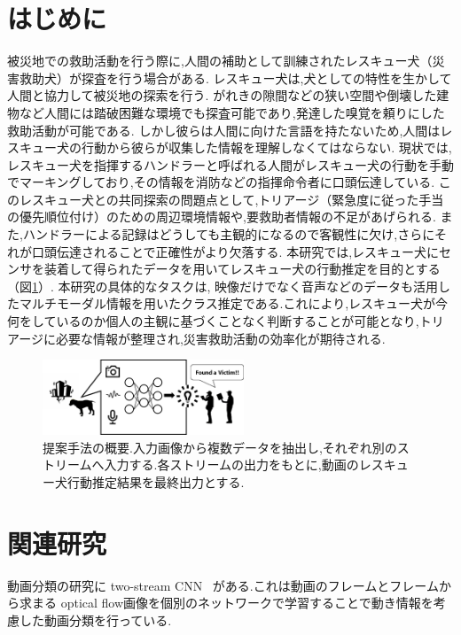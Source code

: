 \documentclass[MIRU,submit]{miru2019j}
\begin{document}
\section{はじめに}
被災地での救助活動を行う際に,人間の補助として訓練されたレスキュー犬（災害救助犬）が探査を行う場合がある.
レスキュー犬は,犬としての特性を生かして人間と協力して被災地の探索を行う.
がれきの隙間などの狭い空間や倒壊した建物など人間には踏破困難な環境でも探査可能であり,発達した嗅覚を頼りにした救助活動が可能である.
しかし彼らは人間に向けた言語を持たないため,人間はレスキュー犬の行動から彼らが収集した情報を理解しなくてはならない.
現状では,レスキュー犬を指揮するハンドラーと呼ばれる人間がレスキュー犬の行動を手動でマーキングしており,その情報を消防などの指揮命令者に口頭伝達している.
このレスキュー犬との共同探索の問題点として,トリアージ（緊急度に従った手当の優先順位付け）のための周辺環境情報や,要救助者情報の不足があげられる.
また,ハンドラーによる記録はどうしても主観的になるので客観性に欠け,さらにそれが口頭伝達されることで正確性がより欠落する.
本研究では,レスキュー犬にセンサを装着して得られたデータを用いてレスキュー犬の行動推定を目的とする（図\ref{lite_model}）.
本研究の具体的なタスクは, 映像だけでなく音声などのデータも活用したマルチモーダル情報を用いたクラス推定である.これにより,レスキュー犬が今何をしているのか個人の主観に基づくことなく判断することが可能となり,トリアージに必要な情報が整理され,災害救助活動の効率化が期待される.

\begin{figure}[tb]
 \begin{center}
  \includegraphics[width=6cm]{./Figures/dogactrec.eps}
  \caption{提案手法の概要.入力画像から複数データを抽出し,それぞれ別のストリームへ入力する.各ストリームの出力をもとに,動画のレスキュー犬行動推定結果を最終出力とする.}
  \label{lite_model}
 \end{center}
\end{figure}

\section{関連研究}
動画分類の研究に two-stream CNN ~\cite{simonyan2014two}がある.これは動画のフレームとフレームから求まる optical flow画像を個別のネットワークで学習することで動き情報を考慮した動画分類を行っている.
\end{document}
